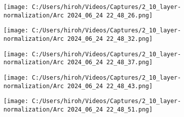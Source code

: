 \documentclass{ltjsarticle}
\begin{document}
\begin{figure}[htbp]
  \centering
  \texttt{[image: C:/Users/hiroh/Videos/Captures/2\_10\_layer-normalization/Arc 2024\_06\_24 22\_48\_26.png]}
\end{figure}
\begin{figure}[htbp]
  \centering
  \texttt{[image: C:/Users/hiroh/Videos/Captures/2\_10\_layer-normalization/Arc 2024\_06\_24 22\_48\_32.png]}
\end{figure}
\begin{figure}[htbp]
  \centering
  \texttt{[image: C:/Users/hiroh/Videos/Captures/2\_10\_layer-normalization/Arc 2024\_06\_24 22\_48\_37.png]}
\end{figure}
\begin{figure}[htbp]
  \centering
  \texttt{[image: C:/Users/hiroh/Videos/Captures/2\_10\_layer-normalization/Arc 2024\_06\_24 22\_48\_43.png]}
\end{figure}
\begin{figure}[htbp]
  \centering
  \texttt{[image: C:/Users/hiroh/Videos/Captures/2\_10\_layer-normalization/Arc 2024\_06\_24 22\_48\_51.png]}
\end{figure}
\end{document}
